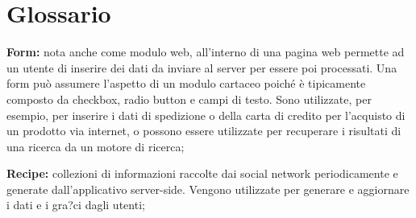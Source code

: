 %

\section{Glossario} %
\label{sec:glossario}

	\textbf{Form:} nota anche come modulo web, all'interno di una pagina web permette
ad un utente di inserire dei dati da inviare al server per essere poi processati.
Una form può assumere l'aspetto di un modulo cartaceo poiché è tipicamente
composto da checkbox, radio button e campi di testo. Sono utilizzate, per
esempio, per inserire i dati di spedizione o della carta di credito per l'acquisto
di un prodotto via internet, o possono essere utilizzate per recuperare i risultati
di una ricerca da un motore di ricerca;

	\textbf{Recipe:} collezioni di informazioni raccolte dai social network periodicamente e generate dall'applicativo server-side. Vengono utilizzate per generare e aggiornare i dati e i gra?ci dagli utenti;

